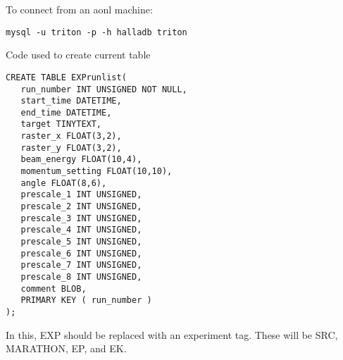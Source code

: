 \documentclass[10pt]{article}
\begin{document}
To connect from an aonl machine:
\begin{verbatim}
mysql -u triton -p -h halladb triton
\end{verbatim}

Code used to create current table

\begin{verbatim}
CREATE TABLE EXPrunlist(
   run_number INT UNSIGNED NOT NULL,
   start_time DATETIME,
   end_time DATETIME,
   target TINYTEXT,
   raster_x FLOAT(3,2),
   raster_y FLOAT(3,2),
   beam_energy FLOAT(10,4),
   momentum_setting FLOAT(10,10),
   angle FLOAT(8,6),
   prescale_1 INT UNSIGNED,
   prescale_2 INT UNSIGNED,
   prescale_3 INT UNSIGNED,
   prescale_4 INT UNSIGNED,
   prescale_5 INT UNSIGNED,
   prescale_6 INT UNSIGNED,
   prescale_7 INT UNSIGNED,
   prescale_8 INT UNSIGNED,
   comment BLOB,
   PRIMARY KEY ( run_number )
);
\end{verbatim}

In this, EXP should be replaced with an experiment tag. These will be SRC, MARATHON, EP, and EK. 
\end{document}
